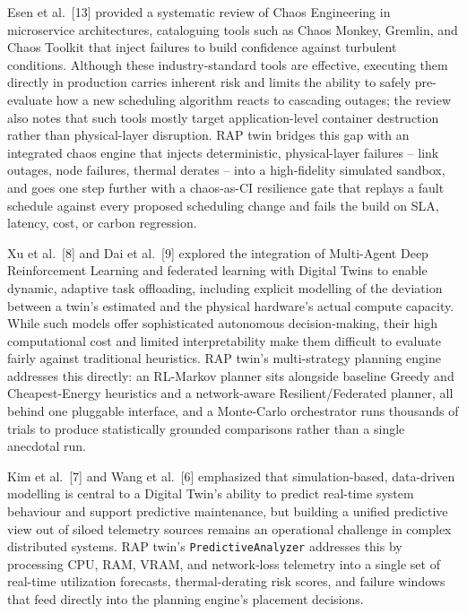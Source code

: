 \documentclass[12pt,a4]{report}
\begin{document}
Esen et al.~[13] provided a systematic review of Chaos Engineering in microservice architectures, cataloguing tools such as Chaos Monkey, Gremlin, and Chaos Toolkit that inject failures to build confidence against turbulent conditions. Although these industry-standard tools are effective, executing them directly in production carries inherent risk and limits the ability to safely pre-evaluate how a new scheduling algorithm reacts to cascading outages; the review also notes that such tools mostly target application-level container destruction rather than physical-layer disruption. RAP twin bridges this gap with an integrated chaos engine that injects deterministic, physical-layer failures -- link outages, node failures, thermal derates -- into a high-fidelity simulated sandbox, and goes one step further with a chaos-as-CI resilience gate that replays a fault schedule against every proposed scheduling change and fails the build on SLA, latency, cost, or carbon regression.

Xu et al.~[8] and Dai et al.~[9] explored the integration of Multi-Agent Deep Reinforcement Learning and federated learning with Digital Twins to enable dynamic, adaptive task offloading, including explicit modelling of the deviation between a twin's estimated and the physical hardware's actual compute capacity. While such models offer sophisticated autonomous decision-making, their high computational cost and limited interpretability make them difficult to evaluate fairly against traditional heuristics. RAP twin's multi-strategy planning engine addresses this directly: an RL-Markov planner sits alongside baseline Greedy and Cheapest-Energy heuristics and a network-aware Resilient/Federated planner, all behind one pluggable interface, and a Monte-Carlo orchestrator runs thousands of trials to produce statistically grounded comparisons rather than a single anecdotal run.

Kim et al.~[7] and Wang et al.~[6] emphasized that simulation-based, data-driven modelling is central to a Digital Twin's ability to predict real-time system behaviour and support predictive maintenance, but building a unified predictive view out of siloed telemetry sources remains an operational challenge in complex distributed systems. RAP twin's \texttt{PredictiveAnalyzer} addresses this by processing CPU, RAM, VRAM, and network-loss telemetry into a single set of real-time utilization forecasts, thermal-derating risk scores, and failure windows that feed directly into the planning engine's placement decisions.
\end{document}
